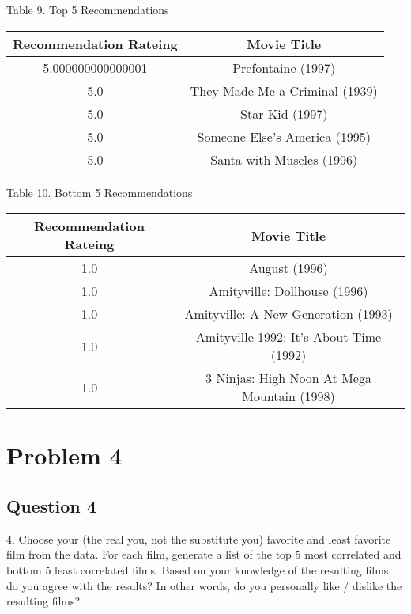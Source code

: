 \documentclass[10pt,letterpaper]{article}
\begin{document}
Table 9. Top 5 Recommendations\\
\begin{center}
  \begin{tabular}{ | c | c }
    \hline
     Recommendation Rateing & Movie Title\\ \hline
     5.000000000000001 & Prefontaine (1997)\\ \hline 
     5.0 & They Made Me a Criminal (1939)\\ \hline
     5.0 & Star Kid (1997)\\ \hline
     5.0 & Someone Else's America (1995)\\ \hline
     5.0 & Santa with Muscles (1996)\\ \hline
    \hline
  \end{tabular}
\end{center}

Table 10. Bottom 5 Recommendations\\
\begin{center}
  \begin{tabular}{ | c | c }
    \hline
     Recommendation Rateing & Movie Title\\ \hline
     1.0 & August (1996)\\ \hline
     1.0 & Amityville: Dollhouse (1996)\\ \hline
     1.0 & Amityville: A New Generation (1993)\\ \hline
     1.0 & Amityville 1992: It's About Time (1992) \\ \hline
     1.0 & 3 Ninjas: High Noon At Mega Mountain (1998)\\ \hline
    \hline
  \end{tabular}
\end{center}


\pagebreak
\section{Problem 4}
\subsection{Question 4}
4.  Choose your (the real you, not the substitute you) favorite and least favorite film from the data.  For each film, generate a list of the top 5 most correlated and bottom 5 least correlated films.  Based on your knowledge of the resulting films, do you agree with the results?  In other words, do you personally like / dislike the resulting films?\\
\\
\end{document}
